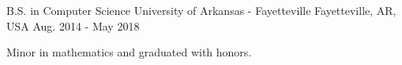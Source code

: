 

\begin{cventries}

  \cventry
  {B.S. in Computer Science} %
  {University of Arkansas - Fayetteville} %
  {Fayetteville, AR, USA} %
  {Aug. 2014 - May 2018} %
  {
    \begin{cvitems} %
      \item {Minor in mathematics and graduated with honors.}
    \end{cvitems}
  }

\end{cventries}
